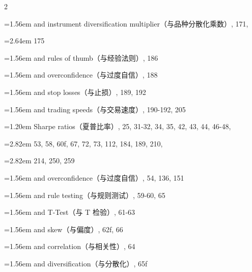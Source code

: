 {\begin{multicols}{2}
\par \noindent\hangindent=1.56em\hspace*{0.36em} and instrument diversification multiplier（与品种分散化乘数）, 171,
\par \noindent\hangindent=2.64em\hspace*{1.44em} 175
\par \noindent\hangindent=1.56em\hspace*{0.36em} and rules of thumb（与经验法则）, 186
\par \noindent\hangindent=1.56em\hspace*{0.36em} and overconfidence（与过度自信）, 188
\par \noindent\hangindent=1.56em\hspace*{0.36em} and stop losses（与止损）, 189, 192
\par \noindent\hangindent=1.56em\hspace*{0.36em} and trading speeds（与交易速度）, 190-192, 205
\par \noindent\hangindent=1.20em\hspace*{0.00em} Sharpe ratios（夏普比率）, 25, 31-32, 34, 35, 42, 43, 44, 46-48,
\par \noindent\hangindent=2.82em\hspace*{1.62em} 53, 58, 60f, 67, 72, 73, 112, 184, 189, 210,
\par \noindent\hangindent=2.82em\hspace*{1.62em} 214, 250, 259
\par \noindent\hangindent=1.56em\hspace*{0.36em} and overconfidence（与过度自信）, 54, 136, 151
\par \noindent\hangindent=1.56em\hspace*{0.36em} and rule testing（与规则测试）, 59-60, 65
\par \noindent\hangindent=1.56em\hspace*{0.36em} and T-Test（与 T 检验）, 61-63
\par \noindent\hangindent=1.56em\hspace*{0.36em} and skew（与偏度）, 62f, 66
\par \noindent\hangindent=1.56em\hspace*{0.36em} and correlation（与相关性）, 64
\par \noindent\hangindent=1.56em\hspace*{0.36em} and diversification（与分散化）, 65f

\end{multicols}}
